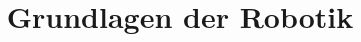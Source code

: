 \documentclass[german, notodo]{fdsummary}
\title{Grundlagen der Robotik}
\begin{document}
	\maketitle
	\tableofcontents
	\listoftodos

	
\end{document}

